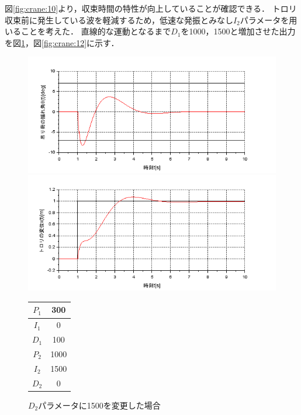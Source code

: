 \documentclass[dvipdfmx,titlepage,a4j]{jsarticle}  %
\begin{document}
図\ref{fig:crane:10}より，収束時間の特性が向上していることが確認できる．
トロリ収束前に発生している波を軽減するため，低速な発振とみなし$I_2$パラメータを用いることを考えた．
直線的な運動となるまで$D_1$を1000，1500と増加させた出力を図\ref{fig:crane:11}，図\ref{fig:crane:12}に示す．

\begin{figure}[H]
  \begin{minipage}{4.5cm}
    \centering
    \includegraphics[keepaspectratio, scale=0.35]{../graph/crane/ang-P1-300-I1-0-D1-100-P2-1000-I2-1500-D2-0.png}
  \end{minipage}
  \hfill
  \begin{minipage}{4.5cm}
    \centering
    \includegraphics[keepaspectratio, scale=0.35]{../graph/crane/po-P1-300-I1-0-D1-100-P2-1000-I2-1500-D2-0.png}
  \end{minipage}
  \hfill
  \begin{minipage}{3cm}
    \begin{center}
      \begin{tabular}{c|c}
        \hline
        $P_1$ & 300  \\ \hline
        $I_1$ & 0    \\ \hline
        $D_1$ & 100  \\ \hline
        $P_2$ & 1000 \\ \hline
        $I_2$ & 1500 \\ \hline
        $D_2$ & 0    \\
        \hline
      \end{tabular}
    \end{center}
  \end{minipage}
  \hfill
  \caption{$D_2$パラメータに1500を変更した場合}
  \label{fig:crane:11}
\end{figure}
\end{document}
